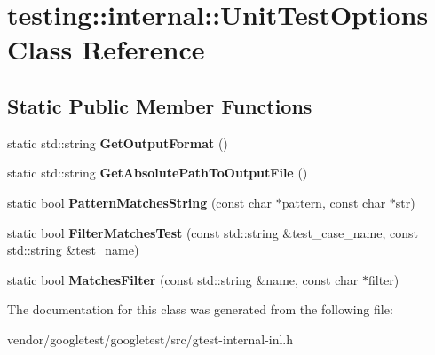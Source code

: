 \hypertarget{classtesting_1_1internal_1_1UnitTestOptions}{}\section{testing\+:\+:internal\+:\+:Unit\+Test\+Options Class Reference}
\label{classtesting_1_1internal_1_1UnitTestOptions}
\subsection*{Static Public Member Functions}
\begin{DoxyCompactItemize}
\item 
static std\+::string {\bfseries Get\+Output\+Format} ()\hypertarget{classtesting_1_1internal_1_1UnitTestOptions_ad65cb6f5a13a146a93490e12cf6d8570}{}\label{classtesting_1_1internal_1_1UnitTestOptions_ad65cb6f5a13a146a93490e12cf6d8570}

\item 
static std\+::string {\bfseries Get\+Absolute\+Path\+To\+Output\+File} ()\hypertarget{classtesting_1_1internal_1_1UnitTestOptions_a8b29c6a22fd2f904c6b0453e403f58fa}{}\label{classtesting_1_1internal_1_1UnitTestOptions_a8b29c6a22fd2f904c6b0453e403f58fa}

\item 
static bool {\bfseries Pattern\+Matches\+String} (const char $\ast$pattern, const char $\ast$str)\hypertarget{classtesting_1_1internal_1_1UnitTestOptions_a9b6907c74fa654aba4888bf6043e1cad}{}\label{classtesting_1_1internal_1_1UnitTestOptions_a9b6907c74fa654aba4888bf6043e1cad}

\item 
static bool {\bfseries Filter\+Matches\+Test} (const std\+::string \&test\+\_\+case\+\_\+name, const std\+::string \&test\+\_\+name)\hypertarget{classtesting_1_1internal_1_1UnitTestOptions_a3e8303523dda985b46c3246ee15cda42}{}\label{classtesting_1_1internal_1_1UnitTestOptions_a3e8303523dda985b46c3246ee15cda42}

\item 
static bool {\bfseries Matches\+Filter} (const std\+::string \&name, const char $\ast$filter)\hypertarget{classtesting_1_1internal_1_1UnitTestOptions_a440fa46f4ee0e564d7cc382e1171f496}{}\label{classtesting_1_1internal_1_1UnitTestOptions_a440fa46f4ee0e564d7cc382e1171f496}

\end{DoxyCompactItemize}


The documentation for this class was generated from the following file\+:\begin{DoxyCompactItemize}
\item 
vendor/googletest/googletest/src/gtest-\/internal-\/inl.\+h\end{DoxyCompactItemize}
